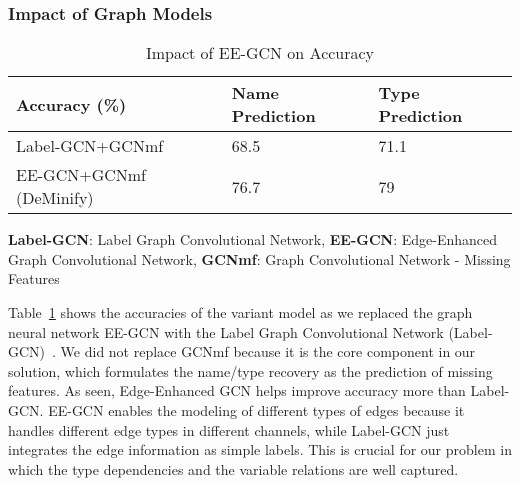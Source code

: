 \subsubsection{Impact of Graph Models}
\label{sec:models}



\begin{table}[!ht]
  \centering
  \tabcolsep 2.5pt
    \begin{tabular}{|l|l|l|}
    \hline
        Accuracy (\%) & Name Prediction & Type Prediction\\ \hline
        Label-GCN+GCNmf & 68.5 & 71.1 \\ \hline
        EE-GCN+GCNmf (DeMinify) & 76.7 & 79 \\ \hline
    \end{tabular}
    {\bf Label-GCN}: Label Graph Convolutional Network, {\bf EE-GCN}: Edge-Enhanced Graph Convolutional Network, {\bf GCNmf}: Graph Convolutional Network - Missing Features
    \caption{Impact of EE-GCN on Accuracy}
    \label{tab:sensi-graph}
\end{table}

Table~\ref{tab:sensi-graph} shows the accuracies of the variant model
as we replaced the graph neural network EE-GCN with the Label Graph
Convolutional Network (Label-GCN)~\cite{label-gcn}. We did not replace
GCNmf because it is the core component in our solution, which
formulates the name/type recovery as the prediction of missing
features. As seen, Edge-Enhanced GCN helps improve accuracy more than
Label-GCN. EE-GCN enables the modeling of different types of edges
because it handles different edge types in different channels, while
Label-GCN just integrates the edge information as simple labels.
This is crucial for our problem in which the type dependencies
and the variable relations are well captured.


